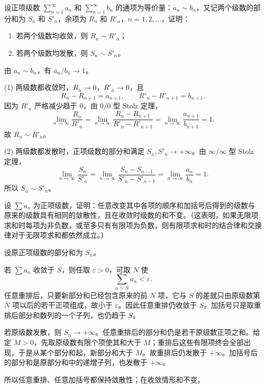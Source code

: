 \begin{xexercise}[1]
设正项级数 $\sum_{n=1}^{\infty}a_n$ 和 $\sum_{n=1}^{\infty}b_n$ 的通项为等价量：$a_n\sim b_n$，又记两个级数的部分和为 $S_n$ 和 $S'_n$，余项为 $R_n$ 和 $R'_n$，$n=1,2,\ldots$，证明：
\begin{enumerate}[label=(\arabic*)]
\item 若两个级数均收敛，则 $R_n\sim R'_n$；
\item 若两个级数均发散，则 $S_n\sim S'_n$。
\end{enumerate}
\end{xexercise}
\begin{xsolution}
由 $a_n\sim b_n$，有 $a_n/b_n\to1$。

(1) 两级数都收敛时，$R_n\to0$，$R'_n\to0$，且
\[
 R_n-R_{n+1}=a_{n+1},\qquad R'_n-R'_{n+1}=b_{n+1}.
\]
因为 $R'_n$ 严格减少趋于 $0$，由 $0/0$ 型 Stolz 定理，
\[
 \lim_{n\to\infty}\frac{R_n}{R'_n}
 =\lim_{n\to\infty}\frac{R_n-R_{n+1}}{R'_n-R'_{n+1}}
 =\lim_{n\to\infty}\frac{a_{n+1}}{b_{n+1}}=1.
\]
故 $R_n\sim R'_n$。

(2) 两级数都发散时，正项级数的部分和满足 $S_n,S'_n\to+\infty$。由 $\infty/\infty$ 型 Stolz 定理，
\[
 \lim_{n\to\infty}\frac{S_n}{S'_n}
 =\lim_{n\to\infty}\frac{S_n-S_{n-1}}{S'_n-S'_{n-1}}
 =\lim_{n\to\infty}\frac{a_n}{b_n}=1.
\]
所以 $S_n\sim S'_n$。
\end{xsolution}


\begin{xexercise}[2]
设 $\sum a_n$ 为正项级数，证明：任意改变其中各项的顺序和加括号后得到的级数与原来的级数具有相同的敛散性，且在收敛时级数的和不变。（这表明，如果无限项求和时每项为非负数，或至多只有有限项为负数，则有限项求和时的结合律和交换律对于无限项求和都依然成立。）
\end{xexercise}
\begin{xsolution}
设原正项级数的部分和为 $S_n$。

若 $\sum a_n$ 收敛于 $S$，则任取 $\varepsilon>0$，可取 $N$ 使
\[
 \sum_{n>N}a_n<\varepsilon.
\]
任意重排后，只要新部分和已经包含原来的前 $N$ 项，它与 $S$ 的差就只由原级数第 $N$ 项以后的若干正项组成，故小于 $\varepsilon$。因此任意重排仍收敛于 $S$。加括号只是取重排后部分和数列的一个子列，也仍趋于 $S$。

若原级数发散，则 $S_n\to+\infty$。任意重排后的部分和仍是若干原级数正项之和。给定 $M>0$，先取原级数有限个项使其和大于 $M$；重排后这些有限项终会全部出现，于是从某个部分和起，新部分和大于 $M$。故重排后仍发散于 $+\infty$。加括号后的部分和是原部分和中的递增子列，也发散于 $+\infty$。

所以任意重排、任意加括号都保持敛散性；在收敛情形和不变。
\end{xsolution}


